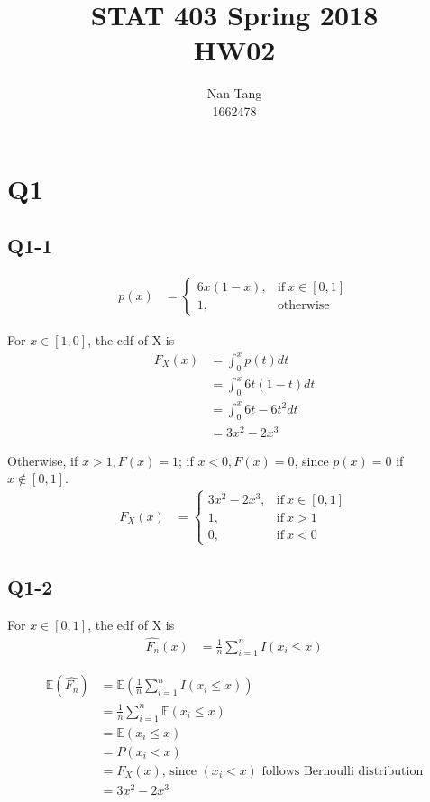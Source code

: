 \documentclass[12pt,letterpaper]{article}
\author{Nan Tang\\1662478}
\title{STAT 403 Spring 2018\\HW02}
\let\hat\widehat
\begin{document}
\maketitle

\section*{Q1}

\subsection*{Q1-1}

\begin{align*}
p(x) &= 
\begin{cases}
      6x(1-x), & \text{if}\ x \in [0, 1] \\
      1, & \text{otherwise}
\end{cases}
\end{align*}

\noindent For $x \in [1, 0]$, the cdf of X is 
\begin{align*}
F_X(x) &= \int_{0}^{x} p(t) dt\\
&= \int_{0}^{x} 6t(1-t) dt \\
&= \int_{0}^{x}6t - 6t^2 dt \\
&= 3x^2 - 2x^3
\end{align*}

\noindent Otherwise, if $x > 1, F(x) = 1$; if $x < 0, F(x) = 0$, since $p(x) = 0$ if $x \notin [0, 1]$.
\begin{align*}
F_X(x) &= 
\begin{cases}
      3x^2 - 2x^3, & \text{if}\ x \in [0, 1] \\
      1, & \text{if}\ x > 1 \\
      0, & \text{if}\ x < 0 
\end{cases}
\end{align*}

\pagebreak
\subsection*{Q1-2}
\noindent For $x \in [0, 1]$, the edf of X is
\begin{align*}
\hat{F_n}(x) &= \frac{1}{n} \sum_{i=1}^{n} I(x_i \leq x)
\end{align*}

\begin{align*}
\mathbb{E}(\hat{F_n}) &= \mathbb{E}( \frac{1}{n} \sum_{i=1}^{n} I(x_i \leq x)) \\
&=  \frac{1}{n} \sum_{i=1}^{n} \mathbb{E}(x_i \leq x) \\
&=  \mathbb{E}(x_i \leq x) \\
&= P(x_i < x) \\
&= F_X(x) \text{, since $(x_i < x)$ follows Bernoulli distribution}\\
&= 3x^2 - 2x^3
\end{align*}
\end{document}
